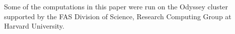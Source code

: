 Some of the computations in this paper were run on the Odyssey cluster supported by the FAS Division of Science, Research Computing Group at Harvard University.